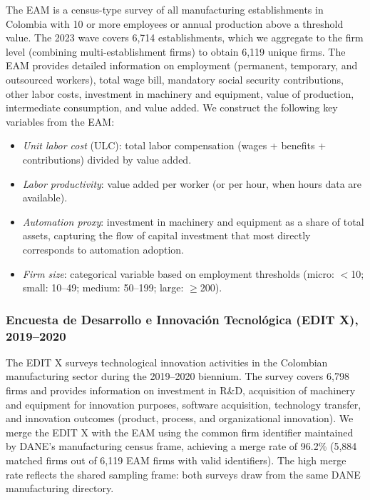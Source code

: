 \documentclass{article}
\begin{document}
The EAM is a census-type survey of all manufacturing establishments in Colombia with 10 or more employees or annual production above a threshold value. The 2023 wave covers 6,714 establishments, which we aggregate to the firm level (combining multi-establishment firms) to obtain 6,119 unique firms. The EAM provides detailed information on employment (permanent, temporary, and outsourced workers), total wage bill, mandatory social security contributions, other labor costs, investment in machinery and equipment, value of production, intermediate consumption, and value added. We construct the following key variables from the EAM:

\begin{itemize}[nosep]
\item \textit{Unit labor cost} (ULC): total labor compensation (wages + benefits + contributions) divided by value added.
\item \textit{Labor productivity}: value added per worker (or per hour, when hours data are available).
\item \textit{Automation proxy}: investment in machinery and equipment as a share of total assets, capturing the flow of capital investment that most directly corresponds to automation adoption.
\item \textit{Firm size}: categorical variable based on employment thresholds (micro: $<$10; small: 10--49; medium: 50--199; large: $\geq$200).
\end{itemize}

\subsubsection*{Encuesta de Desarrollo e Innovaci\'on Tecnol\'ogica (EDIT X), 2019--2020}

The EDIT X surveys technological innovation activities in the Colombian manufacturing sector during the 2019--2020 biennium. The survey covers 6,798 firms and provides information on investment in R\&D, acquisition of machinery and equipment for innovation purposes, software acquisition, technology transfer, and innovation outcomes (product, process, and organizational innovation). We merge the EDIT X with the EAM using the common firm identifier maintained by DANE's manufacturing census frame, achieving a merge rate of 96.2\% (5,884 matched firms out of 6,119 EAM firms with valid identifiers). The high merge rate reflects the shared sampling frame: both surveys draw from the same DANE manufacturing directory.
\end{document}
